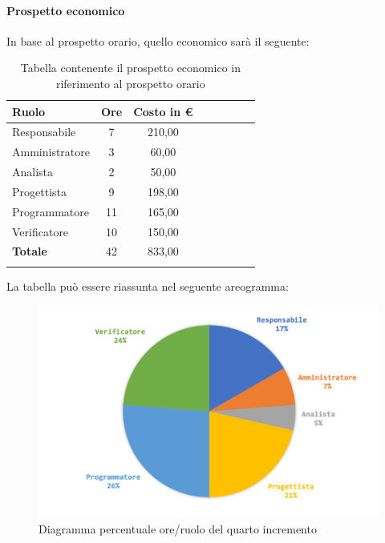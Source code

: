 			\paragraph{Prospetto economico}
			In base al prospetto orario, quello economico sarà il seguente: 
			
			\begin{longtable}{|l|c|c|c|c|c|c|c|}
				\hline
				\rowcolor{lighter-grayer}
				\textbf{Ruolo} & \textbf{Ore} & \textbf{Costo in € } \\
				\hline
				\endfirsthead
				
				\hline
				Responsabile 	    & 7 & 210,00\\
				\hline 
				\hline
				Amministratore	   & 3 & 60,00\\
				\hline
				\hline
				Analista 				& 2 & 50,00\\
				\hline
				\hline
				Progettista 		   & 9 & 198,00\\
				\hline
				\hline
				Programmatore 	  & 11 & 165,00\\
				\hline
				\hline
				Verificatore 		   & 10 & 150,00\\
				\hline
				\textbf{Totale} 	 & 42 & 833,00\\
				\hline
				\caption{Tabella contenente il prospetto economico in riferimento al prospetto orario}
			\end{longtable}
			\pagebreak
			
			La tabella può essere riassunta nel seguente areogramma:
			\begin{figure}[H]
				\centering
				\includegraphics[width=0.8\linewidth]{./images/preventivo/incremento4-2.png}
				\caption{Diagramma percentuale ore/ruolo del quarto incremento}
				\label{fig:diagramma costi ruolo incremento IV}
			\end{figure}
		
